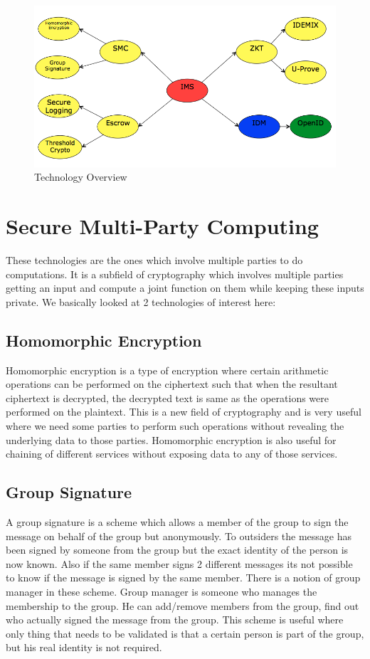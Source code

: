 \begin{figure}[h]
	\centering
	\includegraphics[width=\textwidth]{figures/Technologies}
	\caption{Technology Overview}
	\label{fig:Technologies}
\end{figure}
\section{Secure Multi-Party Computing}
These technologies are the ones which involve multiple parties to do computations. It is a subfield of cryptography which involves multiple parties getting an input and compute a joint function on them while keeping these inputs private. We basically looked at 2 technologies of interest here:
\subsection{Homomorphic Encryption}
Homomorphic encryption is a type of encryption where certain arithmetic operations can be performed on the ciphertext such that when the resultant ciphertext is decrypted, the decrypted text is same as the operations were performed on the plaintext. This is a new field of cryptography and is very useful where we need some parties to perform such operations without revealing the underlying data to those parties. Homomorphic encryption is also useful for chaining of different services without exposing data to any of those services.
\subsection{Group Signature}
A group signature is a scheme which allows a member of the group to sign the message on behalf of the group but anonymously. To outsiders the message has been signed by someone from the group but the exact identity of the person is now known. Also if the same member signs 2 different messages its not possible to know if the message is signed by the same member. There is a notion of group manager in these scheme. Group manager is someone who manages the membership to the group. He can add/remove members from the group, find out who actually signed the message from the group. This scheme is useful where only thing that needs to be validated is that a certain person is part of the group, but his real identity is not required.
